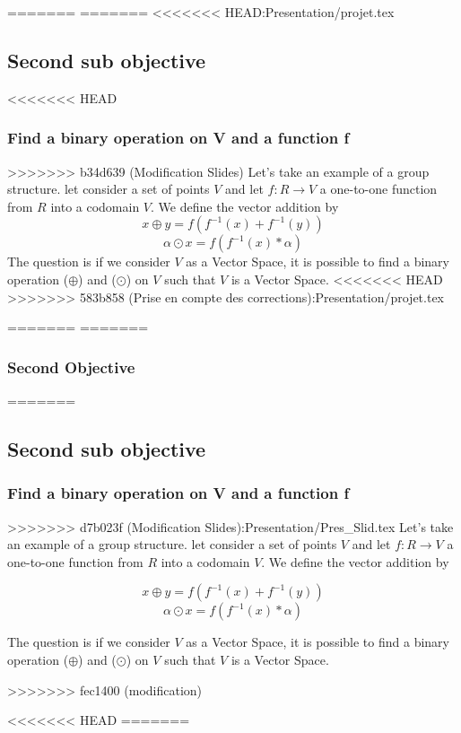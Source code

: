 \documentclass{beamer}
\begin{document}
\begin{frame}
\begin{frame}
\begin{frame}
\begin{frame}
\begin{frame}
=======
=======
<<<<<<< HEAD:Presentation/projet.tex
\subsection{Second sub objective}
\begin{frame}
<<<<<<< HEAD
    \frametitle{Find a binary operation on V and a function f }
>>>>>>> b34d639 (Modification Slides)
    Let's take an example of a group structure.
    let consider a set of points  $ V $ and let  $ f: R \rightarrow V $ a one-to-one
    function from $R$ into a codomain $V$. We define the vector addition by
    $$ x \oplus y = f(f^{-1}(x) + f^{-1}(y)) $$
    $$ \alpha \odot x = f(f^{-1}(x) * \alpha) $$
    The question is if we consider $V$ as a Vector Space, it is possible to find a binary operation ($\oplus$) and ($\odot$) on $V$ such that $V$ is a Vector Space.
<<<<<<< HEAD
>>>>>>> 583b858 (Prise en compte des corrections):Presentation/projet.tex
\end{frame}
=======
=======
    \frametitle{Second Objective}
=======



\subsection{Second sub objective}
\begin{frame}
    \frametitle{Find a binary operation on V and a function f }
>>>>>>> d7b023f (Modification Slides):Presentation/Pres_Slid.tex
	Let's take an example of a group structure.
	let consider a set of points  $ V $ and let  $ f: R \rightarrow V $ a one-to-one
	function from $R$ into a codomain $V$. We define the vector addition by
	
    $$ x \oplus y = f(f^{-1}(x) + f^{-1}(y)) $$
    $$ \alpha \odot x = f(f^{-1}(x) * \alpha) $$

	The question is if we consider $V$ as a Vector Space, it is possible to find a binary operation ($\oplus$) and ($\odot$) on $V$ such that $V$ is a Vector Space.
	
>>>>>>> fec1400 (modification)
\end{frame}
<<<<<<< HEAD
=======


\end{frame}
\end{frame}
\end{frame}
\end{frame}
\end{frame}
\end{document}

